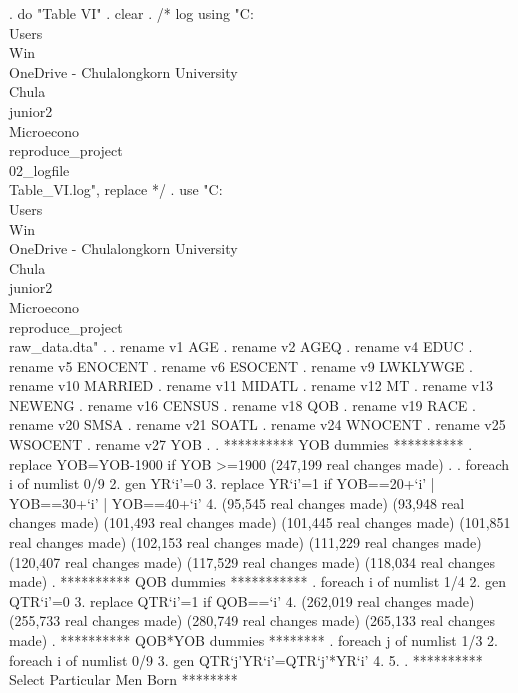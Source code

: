. do "Table VI"
{\smallskip}
. clear
{\smallskip}
. /* log using "C:\\Users\\Win\\OneDrive - Chulalongkorn University\\Chula\\junior2\\Microecono\\reproduce_project\\02_logfile\\Table_VI.log", replace  */
. use "C:\\Users\\Win\\OneDrive - Chulalongkorn University\\Chula\\junior2\\Microecono\\reproduce_project\\raw_data.dta"
{\smallskip}
. 
. rename v1 AGE
{\smallskip}
. rename v2 AGEQ
{\smallskip}
. rename v4 EDUC
{\smallskip}
. rename v5 ENOCENT
{\smallskip}
. rename v6 ESOCENT
{\smallskip}
. rename v9 LWKLYWGE
{\smallskip}
. rename v10 MARRIED
{\smallskip}
. rename v11 MIDATL
{\smallskip}
. rename v12 MT
{\smallskip}
. rename v13 NEWENG
{\smallskip}
. rename v16 CENSUS
{\smallskip}
. rename v18 QOB
{\smallskip}
. rename v19 RACE
{\smallskip}
. rename v20 SMSA
{\smallskip}
. rename v21 SOATL
{\smallskip}
. rename v24 WNOCENT
{\smallskip}
. rename v25 WSOCENT
{\smallskip}
. rename v27 YOB
{\smallskip}
. 
. **********  YOB dummies **********
. replace YOB=YOB-1900 if YOB >=1900
(247,199 real changes made)
{\smallskip}
. 
. foreach i of numlist 0/9 {\lbr}
  2. gen YR`i'=0
  3. replace YR`i'=1 if YOB==20+`i' | YOB==30+`i' | YOB==40+`i' 
  4. {\rbr}
(95,545 real changes made)
(93,948 real changes made)
(101,493 real changes made)
(101,445 real changes made)
(101,851 real changes made)
(102,153 real changes made)
(111,229 real changes made)
(120,407 real changes made)
(117,529 real changes made)
(118,034 real changes made)
{\smallskip}
. **********  QOB dummies ***********
. foreach i of numlist 1/4 {\lbr}
  2. gen QTR`i'=0
  3. replace QTR`i'=1 if QOB==`i'
  4. {\rbr}
(262,019 real changes made)
(255,733 real changes made)
(280,749 real changes made)
(265,133 real changes made)
{\smallskip}
. **********  QOB*YOB dummies ********
. foreach j of numlist 1/3 {\lbr}
  2. foreach i of numlist 0/9 {\lbr}
  3. gen QTR`j'YR`i'=QTR`j'*YR`i'
  4. {\rbr}
  5. {\rbr}
{\smallskip}
. **********  Select Particular Men Born ********
